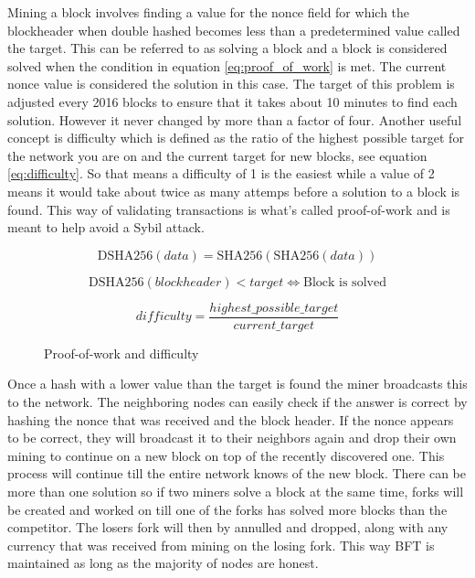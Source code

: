 \documentclass[12pt]{article}
\begin{document}
Mining a block involves finding a value for the nonce field for which the blockheader when double hashed becomes less than a predetermined value called the target. This can be referred to as solving a block and a block is considered solved when the condition in equation \ref{eq:proof_of_work} is met. The current nonce value is considered the solution in this case. The target of this problem is adjusted every 2016 blocks to ensure that it takes about 10 minutes to find each solution. However it never changed by more than a factor of four\cite{tschorsch2015bitcoin}. Another useful concept is difficulty which is defined as the ratio of the highest possible target for the network you are on and the current target for new blocks, see equation \ref{eq:difficulty}. So that means a difficulty of 1 is the easiest while a value of 2 means it would take about twice as many attemps before a solution to a block is found. This way of validating transactions is what's called proof-of-work and is meant to help avoid a Sybil attack\cite{tschorsch2015bitcoin}.

\begin{figure}[h!]
\begin{equation*}
\textrm{DSHA256}(\mathit{data}) = \textrm{SHA256}(\textrm{SHA256}(\mathit{data}))
\end{equation*}

\begin{equation}\label{eq:proof_of_work}
\textrm{DSHA256}(\mathit{blockheader}) < \mathit{target}
\Leftrightarrow \textrm{Block is solved}
\end{equation}

\begin{equation}\label{eq:difficulty}
\mathit{difficulty} = \frac{\mathit{highest\_possible\_target}}{\mathit{current\_target}}
\end{equation}
\caption{Proof-of-work and difficulty}
\end{figure}

Once a hash with a lower value than the target is found the miner broadcasts this to the network. The neighboring nodes can easily check if the answer is correct by hashing the nonce that was received and the block header. If the nonce appears to be correct, they will broadcast it to their neighbors again and drop their own mining to continue on a new block on top of the recently discovered one. This process will continue till the entire network knows of the new block. There can be more than one solution so if two miners solve a block at the same time, forks will be created and worked on till one of the forks has solved more blocks than the competitor. The losers fork will then by annulled and dropped, along with any currency that was received from mining on the losing fork. This way BFT is maintained as long as the majority of nodes are honest.
\end{document}

